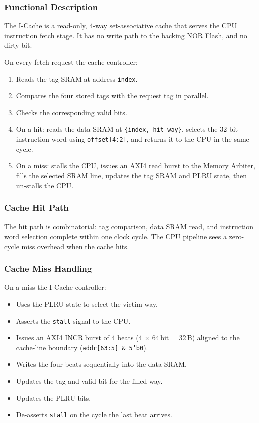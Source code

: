 \subsubsection{Functional Description}

The I-Cache is a read-only, 4-way set-associative cache that serves the
CPU instruction fetch stage.
It has no write path to the backing NOR Flash, and no dirty bit.

On every fetch request the cache controller:
\begin{enumerate}
  \item Reads the tag SRAM at address \texttt{index}.
  \item Compares the four stored tags with the request tag in parallel.
  \item Checks the corresponding valid bits.
  \item On a hit: reads the data SRAM at \texttt{\{index, hit\_way\}},
    selects the 32-bit instruction word using \texttt{offset[4:2]},
    and returns it to the CPU in the same cycle.
  \item On a miss: stalls the CPU, issues an AXI4 read burst to the
    Memory Arbiter, fills the selected SRAM line, updates the tag SRAM and
    PLRU state, then un-stalls the CPU.
\end{enumerate}

\subsubsection{Cache Hit Path}

The hit path is combinatorial: tag comparison, data SRAM read, and
instruction word selection complete within one clock cycle.
The CPU pipeline sees a zero-cycle miss overhead when the cache hits.

\subsubsection{Cache Miss Handling}

On a miss the I-Cache controller:
\begin{itemize}
  \item Uses the PLRU state to select the victim way.
  \item Asserts the \texttt{stall} signal to the CPU.
  \item Issues an AXI4 INCR burst of 4 beats (4 $\times$ 64\,bit = 32\,B)
    aligned to the cache-line boundary (\texttt{addr[63:5] \& 5'b0}).
  \item Writes the four beats sequentially into the data SRAM.
  \item Updates the tag and valid bit for the filled way.
  \item Updates the PLRU bits.
  \item De-asserts \texttt{stall} on the cycle the last beat arrives.
\end{itemize}

